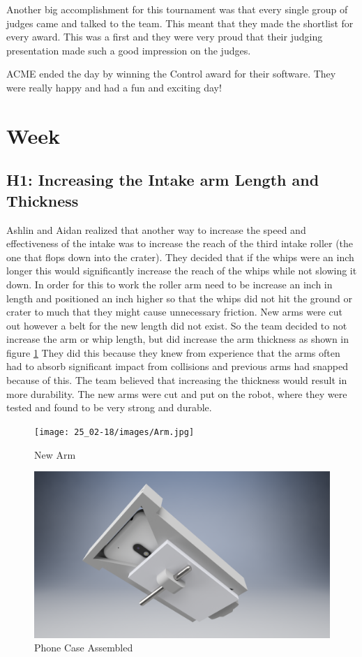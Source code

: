 \documentclass{article}
\begin{document}
Another big accomplishment for this tournament was that every single group of judges came and talked to the team. This meant that they made the shortlist for every award. This was a first and they were very proud that their judging presentation made such a good impression on the judges. 

ACME ended the day by winning the Control award for their software. They were really happy and had a fun and exciting day!
\clearpage \newpage \section{Week \thesection} 
\subsection{H1: Increasing the Intake arm Length and Thickness}

Ashlin and Aidan realized that another way to increase the speed and effectiveness of the intake was to increase the reach of the third intake roller (the one that flops down into the crater). They decided that if the whips were an inch longer this would significantly increase the reach of the whips while not slowing it down. In order for this to work the roller arm need to be increase an inch in length and positioned an inch higher so that the whips did not hit the ground or crater to much that they might cause unnecessary friction. New arms were cut out however a belt for the new length did not exist. So the team decided to not increase the arm or whip length, but did increase the arm thickness as shown in figure \ref{fig:arm} They did this because they knew from experience that the arms often had to absorb significant impact from collisions and previous arms had snapped because of this. The team believed that increasing the thickness would result in more durability. The new arms were cut and put on the robot, where they were tested and found to be very strong and durable.

\begin{figure}
    \centering
    \texttt{[image: 25\_02-18/images/Arm.jpg]}
    \caption{New Arm}
    \label{fig:arm}
\end{figure}

\begin{figure}
    \centering
    \includegraphics[width= 0.5 \textwidth]{25_02-18/images/Phone.png}
    \caption{Phone Case Assembled}
    \label{fig: phone case}
\end{figure}
\end{document}
